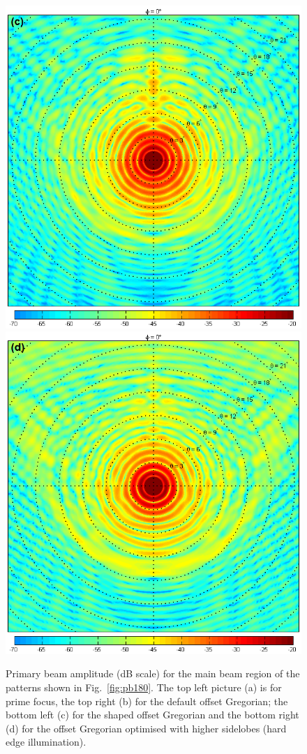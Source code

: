 \documentclass{aa}
\begin{document}
\begin{figure}
  \includegraphics[width=\columnwidth]{TS3e15h_main}\hfill%
  \includegraphics[width=\columnwidth]{TU3e20h_main}
  \caption{\label{fig:pb18}Primary beam amplitude (dB scale) for the main beam
    region of the patterns shown in Fig.~\ref{fig:pb180}.  The top left picture (a)
    is for prime focus, the top right (b) for the default offset Gregorian; the
    bottom left (c) for the shaped offset Gregorian and the bottom right (d) for the
    offset Gregorian optimised with higher sidelobes (hard edge illumination).}
\end{figure}
\end{document}
